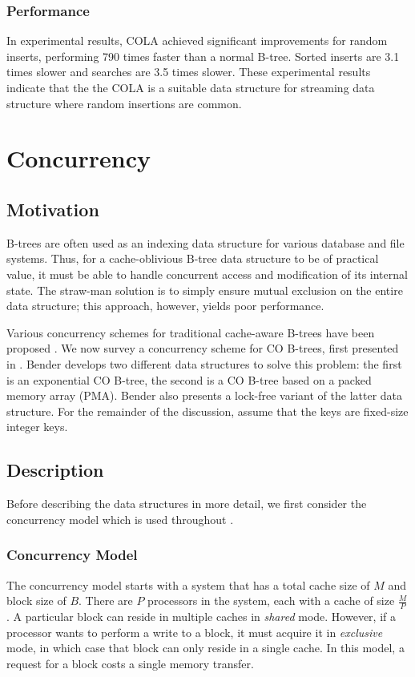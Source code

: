 \documentclass{style}
\begin{document}
\subsubsection{Performance}

In experimental results, COLA achieved significant improvements for random
inserts, performing 790 times faster than a normal B-tree. Sorted inserts are
3.1 times slower and searches are 3.5 times slower. These experimental results
indicate that the the COLA is a suitable data structure for streaming data
structure where random insertions are common.

\section{Concurrency}

\subsection{Motivation}
B-trees are often used as an indexing data structure for various
database and file systems. Thus, for a cache-oblivious B-tree data structure
to be of practical value, it must be able to handle concurrent access and modification
of its internal state. The straw-man solution is to simply ensure mutual exclusion
on the entire data structure; this approach, however, yields poor performance.

Various concurrency schemes for traditional cache-aware B-trees have been
proposed \cite{BayerS77, LehmanY81}. We now survey a concurrency scheme for CO
B-trees, first presented in \cite{BenderFiGi05}. Bender develops two different
data structures to solve this problem: the first is an exponential CO B-tree,
the second is a CO B-tree based on a packed memory array (PMA). Bender
also presents a lock-free variant of the latter data structure. For
the remainder of the discussion, assume that the keys are fixed-size integer
keys.

\subsection{Description}
Before describing the data structures in more detail, we first consider
the concurrency model which is used throughout \cite{BenderFiGi05}.

\subsubsection{Concurrency Model}
The concurrency model starts with a system that has a total cache
size of $M$ and block size of $B$. There are $P$ processors in the
system, each with a cache of size $\frac{M}{P}$. A particular block
can reside in multiple caches in \textit{shared} mode. However, if a
processor wants to perform a write to a block, it must acquire it in 
\textit{exclusive} mode, in which case that block can only reside in
a single cache. In this model, a request for a block costs a single
memory transfer.
\end{document}
